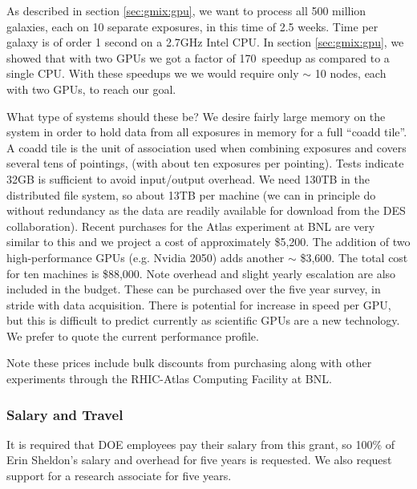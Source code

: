\documentclass[12pt]{article}
\newcommand{\overallspeedup}{170}
\begin{document}
As described in section \ref{sec:gmix:gpu}, we want to process all 500 million
galaxies, each on 10 separate exposures, in this time of 2.5 weeks. Time per
galaxy is of order 1 second on a 2.7GHz Intel CPU.  In section
\ref{sec:gmix:gpu}, we showed that with two GPUs we got a factor of
\overallspeedup\ speedup as compared to a single CPU.  With these speedups we
we would require only $\sim$ 10 nodes, each with two GPUs, to reach our goal. 

What type of systems should these be?  We desire fairly large memory on the
system in order to hold data from all exposures in memory for a full ``coadd
tile''. A coadd tile is the unit of association used when combining exposures
and covers several tens of pointings, (with about ten exposures per pointing).
Tests indicate 32GB is sufficient to avoid input/output overhead.  We need
130TB in the distributed file system, so about 13TB per machine (we can in
principle do without redundancy as the data are readily available for download
from the DES collaboration).  Recent purchases for the Atlas experiment at BNL
are very similar to this and we project a cost of approximately \$5,200.  The
addition of two high-performance GPUs (e.g. Nvidia 2050) adds another $\sim$
\$3,600.  The total cost for ten machines is \$88,000.  Note overhead and
slight yearly escalation are also included in the budget.  These can be
purchased over the five year survey, in stride with data acquisition.  There is
potential for increase in speed per GPU, but this is difficult to predict
currently as scientific GPUs are a new technology.  We prefer to quote the
current performance profile.

Note these prices include bulk discounts from purchasing along with other
experiments through the RHIC-Atlas Computing Facility at BNL.  



\subsubsection{Salary and Travel}

It is required that DOE employees pay their salary from this grant, so 100\% of
Erin Sheldon's salary and overhead for five years is requested.  We also request
support for a research associate for five years.
\end{document}
